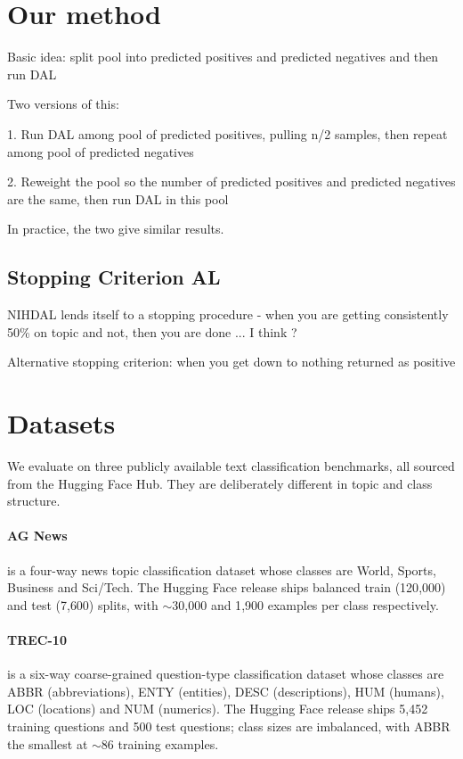 \documentclass[11pt]{article}
\begin{document}
\section{Our method}

Basic idea: split pool into predicted positives and predicted negatives and then run DAL 

Two versions of this:

1. Run DAL among pool of predicted positives, pulling n/2 samples, then repeat among pool of predicted negatives

2. Reweight the pool so the number of predicted positives and predicted negatives are the same, then run DAL in this pool 

In practice, the two give similar results. 

\subsection{Stopping Criterion AL}
NIHDAL lends itself to a stopping procedure - when you are getting consistently 50\% on topic and not, then you are done ... I think ? 

Alternative stopping criterion: when you get down to nothing returned as positive 



\section{Datasets}
\label{sec:datasets}

We evaluate on three publicly available text classification benchmarks, all sourced from the Hugging Face Hub. They are deliberately different in topic and class structure.

\paragraph{AG News} \citep{zhang2015character} is a four-way news topic classification dataset whose classes are World, Sports, Business and Sci/Tech. The Hugging Face release ships balanced train (120{,}000) and test (7{,}600) splits, with $\sim$30{,}000 and 1{,}900 examples per class respectively.

\paragraph{TREC-10} \citep{li-roth-2002-learning, hovy-etal-2001-toward} is a six-way coarse-grained question-type classification dataset whose classes are ABBR (abbreviations), ENTY (entities), DESC (descriptions), HUM (humans), LOC (locations) and NUM (numerics). The Hugging Face release ships 5{,}452 training questions and 500 test questions; class sizes are imbalanced, with ABBR the smallest at $\sim$86 training examples.
\end{document}
